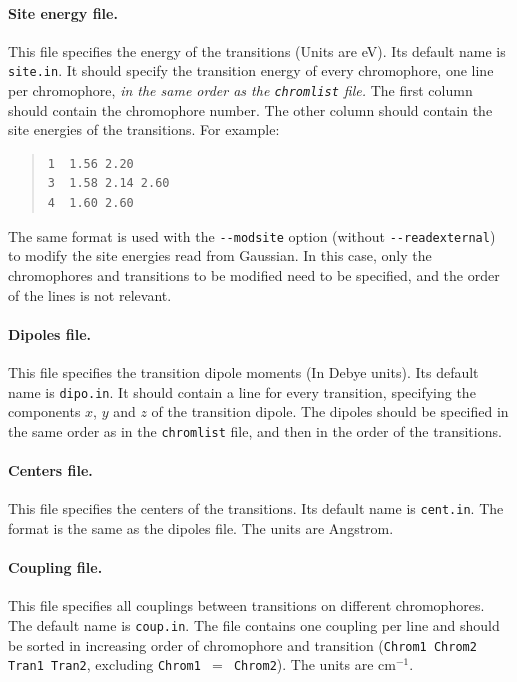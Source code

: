 \documentclass[a4paper,11pt]{article}
\begin{document}
\paragraph*{Site energy file. } 
This file specifies the energy of the transitions (Units are eV). Its default name is \texttt{site.in}. It should specify the transition energy of every chromophore, one line per chromophore, \emph{in the same order as the \texttt{\emph{chromlist}} file.} The first column should contain the chromophore number. The other column should contain the site energies of the transitions. For example:

\begin{quote}
\begin{verbatim}
1  1.56 2.20
3  1.58 2.14 2.60
4  1.60 2.60
\end{verbatim}
\end{quote}

The same format is used with the \texttt{-{}-modsite} option (without \texttt{-{}-readexternal}) to modify the site energies read from Gaussian. In this case, only the chromophores and transitions to be modified need to be specified, and the order of the lines is not relevant. 

\paragraph*{Dipoles file. } 
This file specifies the transition dipole moments (In Debye units). Its default name is \texttt{dipo.in}. It should contain a line for every transition, specifying the components $x$, $y$ and $z$ of the transition dipole. The dipoles should be specified in the same order as in the \texttt{chromlist} file, and then in the order of the transitions. 

\paragraph*{Centers file. } 
This file specifies the centers of the transitions. Its default name is \texttt{cent.in}. The format is the same as the dipoles file. The units are Angstrom.

\paragraph*{Coupling file. } 
This file specifies all couplings between transitions on different chromophores. The default name is \texttt{coup.in}. The file contains one coupling per line and should be sorted in increasing order of chromophore and transition (\texttt{Chrom1 Chrom2 Tran1 Tran2}, excluding \texttt{Chrom1 $=$ Chrom2}). The units are cm$^{-1}$.
\end{document}
